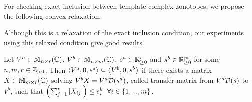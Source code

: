 For checking exact inclusion between template complex zonotopes, we
propose the following convex relaxation.


Although this is a relaxation of the exact
inclusion condition, our experiments using this relaxed
condition give good results.
%
\begin{thm}[Inclusion]\label{thm:inc}
   Let $V^a\in\mathbb{M}_{n\times r}(\mathbb{C})$, $V^b\in\mathbb{M}_{n\times m}(\mathbb{C})$, $s^a\in\mathbb{R}^{r}_{\geq
     0}$ and $s^b\in\mathbb{R}^m_{\geq 0}$ for some $n,m,r\in\mathbb{Z}_{> 0}$.  Then
   $\left<V^a,0,s^a\right>\subseteq \left<V^b,0,s^b\right>$ if there exists a matrix
   $X\in\mathbb{M}_{m\times r}(\mathbb{C})$ solving $V^bX=V^a\mathcal{D}(s^a)$, called 
   transfer matrix from $V^a\mathcal{D}(s)$ to $V^b$, such that
   $\left(\sum_{j=1}^r|X_{ij}|\right)\leq s_i^b~~\forall i\in\{1,...,m\}$.
\end{thm}


